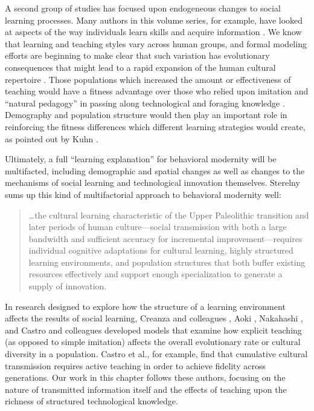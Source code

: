 A second group of studies has focused upon endogeneous changes to social
learning processes. Many authors in this volume series, for example,
have looked at aspects of the way individuals learn skills and acquire
information \citep{Aoki2013Determinants-of, Nishiaki2013Introduction}.
We know that learning and teaching styles vary across human groups, and
formal modeling efforts are beginning to make clear that such variation
has evolutionary consequences that might lead to a rapid expansion of
the human cultural repertoire \citep{Nakahashi2013Cultural-Evolut}.
Those populations which increased the amount or effectiveness of
teaching would have a fitness advantage over those who relied upon
imitation and ``natural pedagogy'' in passing along technological and
foraging knowledge
\citep{Csibra:2011dx, Fogarty:2011gv, Terashima2013}.
Demography and population structure would then play an important role in
reinforcing the fitness differences which different learning strategies
would create, as pointed out by Kuhn
\citeyearpar{Kuhn2013Cultural-Transm}.

Ultimately, a full ``learning explanation'' for behavioral modernity
will be multifacted, including demographic and spatial changes as well
as changes to the mechanisms of social learning and technological
innovation themselves. Sterelny \citeyearpar[p.61]{sterelny2012evolved}
sums up this kind of multifactorial approach to behavioral modernity
well:

\begin{quote}
\ldots{}the cultural learning characteristic of the Upper Paleolithic
transition and later periods of human culture---social transmission with
both a large bandwidth and sufficient accuracy for incremental
improvement---requires individual cognitive adaptations for cultural
learning, highly structured learning environments, and population
structures that both buffer existing resources effectively and support
enough specialization to generate a supply of innovation.
\end{quote}

In research designed to explore how the structure of a learning
environment affects the results of social learning, Creanza and
colleagues \citeyearpar{Creanza2013Exploring-Cultu}, Aoki
\citeyearpar{Aoki2013Determinants-of}, Nakahashi
\citeyearpar{Nakahashi2013Cultural-Evolut}, and Castro and colleagues
\citeyearpar{Castro201474} developed models that examine how explicit
teaching (as opposed to simple imitation) affects the overall
evolutionary rate or cultural diversity in a population. Castro et al.,
for example, find that cumulative cultural transmission requires active
teaching in order to achieve fidelity across generations. Our work in
this chapter follows these authors, focusing on the nature of
transmitted information itself and the effects of teaching upon the
richness of structured technological knowledge.

